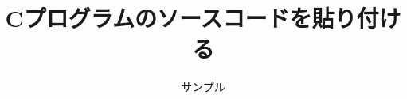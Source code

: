 \documentclass[a4j]{jarticle}
\begin{document}
 
\title{Cプログラムのソースコードを貼り付ける}
\author{サンプル}

\maketitle
 

 
\end{document}
